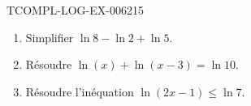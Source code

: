 \begin{exercice}{TCOMPL-LOG-EX-006}{2}{15}
\begin{enumerate}
  \item Simplifier $\ln 8-\ln 2+\ln 5$.
  \item Résoudre $\ln(x)+\ln(x-3)=\ln 10$.
  \item Résoudre l'inéquation $\ln(2x-1)\leq\ln 7$.
\end{enumerate}
\end{exercice}
